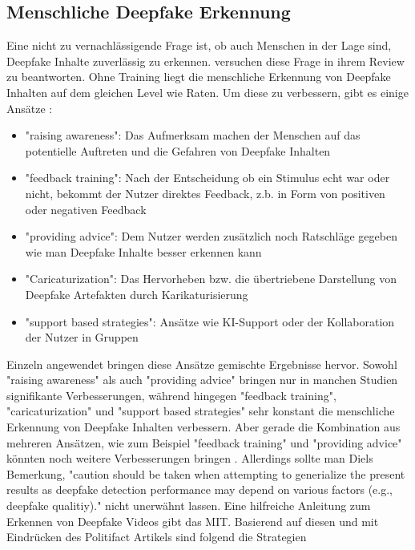 \subsection{Menschliche Deepfake Erkennung}
Eine nicht zu vernachlässigende Frage ist, ob auch Menschen in der Lage sind, Deepfake Inhalte zuverlässig zu erkennen. 
\textcite{dielHumanPerformanceDetecting2024} versuchen diese Frage in ihrem Review zu beantworten. 
Ohne Training liegt die menschliche Erkennung von Deepfake Inhalten auf dem gleichen Level wie Raten. 
Um diese zu verbessern, gibt es einige Ansätze \cite{dielHumanPerformanceDetecting2024}:
\begin{itemize}
    \item "raising awareness": Das Aufmerksam machen der Menschen auf das potentielle Auftreten und die Gefahren von Deepfake Inhalten
    \item "feedback training": Nach der Entscheidung ob ein Stimulus echt war oder nicht, bekommt der Nutzer direktes Feedback, z.b. in Form von positiven oder negativen Feedback
    \item "providing advice": Dem Nutzer werden zusätzlich noch Ratschläge gegeben wie man Deepfake Inhalte besser erkennen kann
    \item "Caricaturization": Das Hervorheben bzw. die übertriebene Darstellung von Deepfake Artefakten durch Karikaturisierung
    \item "support based strategies": Ansätze wie KI-Support oder der Kollaboration der Nutzer in Gruppen
\end{itemize}
Einzeln angewendet bringen diese Ansätze gemischte Ergebnisse hervor. 
Sowohl "raising awareness" als auch "providing advice" bringen nur in manchen Studien signifikante Verbesserungen, 
während hingegen "feedback training", "caricaturization" und "support based strategies" sehr konstant die menschliche Erkennung von Deepfake Inhalten verbessern. 
Aber gerade die Kombination aus mehreren Ansätzen, wie zum Beispiel "feedback training" und "providing advice" könnten noch weitere Verbesserungen bringen \cite{dielHumanPerformanceDetecting2024}. 
Allerdings sollte man Diels Bemerkung, "caution should be taken when attempting to generialize the present results 
as deepfake detection performance may depend on various factors (e.g., deepfake qualitiy)." \cite{dielHumanPerformanceDetecting2024} nicht unerwähnt lassen.
Eine hilfreiche Anleitung zum Erkennen von Deepfake Videos gibt das MIT\cite{ProjectOverviewDetect}.
Basierend auf diesen und mit Eindrücken des Politifact \cite{settlesPolitiFactDemystifiesDeepfake} Artikels sind folgend die Strategien 
